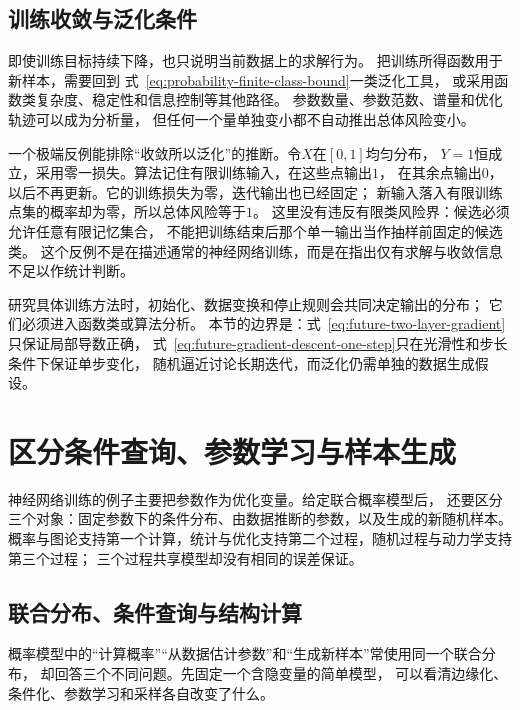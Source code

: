 \subsection{训练收敛与泛化条件}
\label{sec:future-training-convergence-generalization}

即使训练目标持续下降，也只说明当前数据上的求解行为。
把训练所得函数用于新样本，需要回到
式~\eqref{eq:probability-finite-class-bound}一类泛化工具，
或采用函数类复杂度、稳定性和信息控制等其他路径。
参数数量、参数范数、谱量和优化轨迹可以成为分析量，
但任何一个量单独变小都不自动推出总体风险变小。

一个极端反例能排除“收敛所以泛化”的推断。令$X$在$[0,1]$均匀分布，
$Y=1$恒成立，采用零一损失。算法记住有限训练输入，在这些点输出$1$，
在其余点输出$0$，以后不再更新。它的训练损失为零，迭代输出也已经固定；
新输入落入有限训练点集的概率却为零，所以总体风险等于$1$。
这里没有违反有限类风险界：候选必须允许任意有限记忆集合，
不能把训练结束后那个单一输出当作抽样前固定的候选类。
这个反例不是在描述通常的神经网络训练，而是在指出仅有求解与收敛信息不足以作统计判断。

研究具体训练方法时，初始化、数据变换和停止规则会共同决定输出的分布；
它们必须进入函数类或算法分析。
本节的边界是：式~\eqref{eq:future-two-layer-gradient}只保证局部导数正确，
式~\eqref{eq:future-gradient-descent-one-step}只在光滑性和步长条件下保证单步变化，
随机逼近讨论长期迭代，而泛化仍需单独的数据生成假设。

\section{区分条件查询、参数学习与样本生成}
\label{sec:future-probabilistic-inference-learning-generation}

神经网络训练的例子主要把参数作为优化变量。给定联合概率模型后，
还要区分三个对象：固定参数下的条件分布、由数据推断的参数，以及生成的新随机样本。
概率与图论支持第一个计算，统计与优化支持第二个过程，随机过程与动力学支持第三个过程；
三个过程共享模型却没有相同的误差保证。

\subsection{联合分布、条件查询与结构计算}
\label{sec:future-joint-model-conditional-query}

概率模型中的“计算概率”“从数据估计参数”和“生成新样本”常使用同一个联合分布，
却回答三个不同问题。先固定一个含隐变量的简单模型，
可以看清边缘化、条件化、参数学习和采样各自改变了什么。

